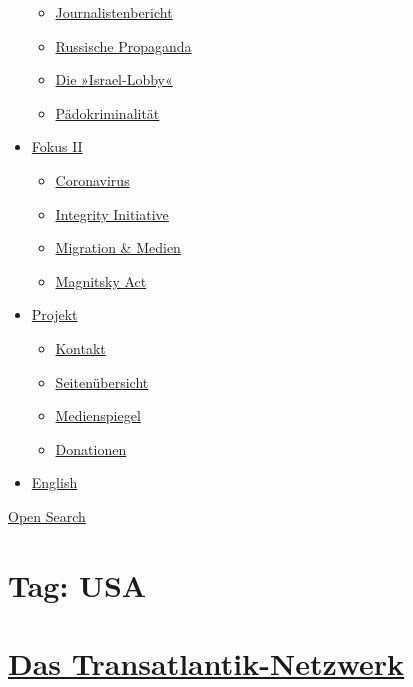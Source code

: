 \begin{itemize}
  \begin{itemize}
  \tightlist
  \item
    \href{https://swprs.org/bericht-eines-journalisten/}{Journalistenbericht}
  \item
    \href{https://swprs.org/russische-propaganda/}{Russische Propaganda}
  \item
    \href{https://swprs.org/die-israel-lobby-fakten-und-mythen/}{Die
    »Israel-Lobby«}
  \item
    \href{https://swprs.org/geopolitik-und-paedokriminalitaet/}{Pädokriminalität}
  \end{itemize}
\item
  \href{https://swprs.org/migration-und-medien/}{Fokus II}

  \begin{itemize}
  \tightlist
  \item
    \href{https://swprs.org/covid-19-hinweis-ii/}{Coronavirus}
  \item
    \href{https://swprs.org/die-integrity-initiative/}{Integrity
    Initiative}
  \item
    \href{https://swprs.org/migration-und-medien/}{Migration \& Medien}
  \item
    \href{https://swprs.org/der-fall-magnitsky/}{Magnitsky Act}
  \end{itemize}
\item
  \href{https://swprs.org/kontakt/}{Projekt}

  \begin{itemize}
  \tightlist
  \item
    \href{https://swprs.org/kontakt/}{Kontakt}
  \item
    \href{https://swprs.org/uebersicht/}{Seitenübersicht}
  \item
    \href{https://swprs.org/medienspiegel/}{Medienspiegel}
  \item
    \href{https://swprs.org/donationen/}{Donationen}
  \end{itemize}
\item
  \href{https://swprs.org/contact/}{English}
\end{itemize}

\protect\hyperlink{}{Open Search}

\hypertarget{tag-usa}{%
\section{Tag: USA}\label{tag-usa}}

\hypertarget{das-transatlantik-netzwerk}{%
\section{\texorpdfstring{\href{https://swprs.org/2017/03/01/das-netzwerk/}{Das
Transatlantik-Netzwerk}}{Das Transatlantik-Netzwerk}}\label{das-transatlantik-netzwerk}}

